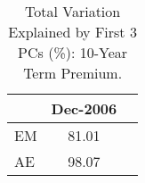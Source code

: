 \begin{tiny}\begin{table}\centering\begin{tabular}{l|cc}\toprule & Dec-2006 \\\midrule EM & 81.01 \\AE & 98.07 \\\bottomrule\end{tabular}\caption{Total Variation Explained by First 3 PCs (\%): 10-Year Term Premium.}\label{tab:temp_tp_common}\end{table}\end{tiny}